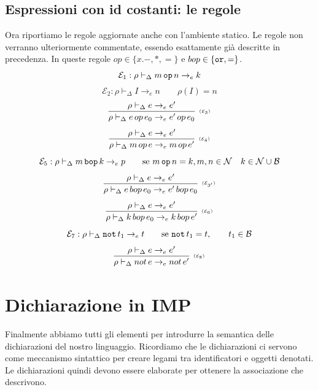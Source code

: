 \documentclass[oneside,a4paper,11pt]{book}
\theoremstyle{italicstyle}
\theoremstyle{normStyle}
\begin{document}
\subsection{Espressioni con id costanti: le regole}
Ora riportiamo le regole aggiornate anche con l'ambiente statico. Le regole 
non verranno ulteriormente commentate, essendo esattamente già descritte in precedenza.
In queste regole $op\in\{x.-,*,=\}$ e $bop\in\{\verb|or|, =\}$.
\[
  \mathcal{E}_1: \rho \vdash_\Delta m \, \verb|op|\,n \rightarrow_e k
\]
\[
  \mathcal{E}_2: \rho \vdash_\Delta I \rightarrow_e n \qquad \rho(I)=n
\]
\[
    \infer[\scriptscriptstyle (\mathcal{E}_3)]
    {
      \rho \vdash_\Delta e \, op \, e_0 \rightarrow_e e' \, op \, e_0
    }
    {
      \rho \vdash_\Delta e \rightarrow_e e'
    }
\]
\[
    \infer[\scriptscriptstyle (\mathcal{E}_4)]
    {
      \rho \vdash_\Delta  m \, op \, e \rightarrow_e m \, op \, e'
    }
    {
      \rho \vdash_\Delta  e \rightarrow_e e'
    }
\]
\[
  \mathcal{E}_5: \rho \vdash_\Delta m\,\verb|bop|\,k\rightarrow_e p \qquad \text{se }m\,\verb|op|\,n = k,m,n \in \mathcal{N}\quad k \in \mathcal{N}\cup\mathcal{B}
\]
\[
    \infer[\scriptscriptstyle (\mathcal{E}_{3'})]
    {
      \rho \vdash_\Delta e \, bop \, e_0 \rightarrow_e e' \, bop \, e_0
    }
    {
      \rho \vdash_\Delta e \rightarrow_e e'
    }
\]
\[
    \infer[\scriptscriptstyle (\mathcal{E}_{6})]
    {
      \rho \vdash_\Delta k \, bop \, e_0 \rightarrow_e k \, bop \, e'
    }
    {
      \rho \vdash_\Delta e \rightarrow_e e'
    }
\]
\[
  \mathcal{E}_7: \rho \vdash_\Delta \verb|not| \,t_1\rightarrow_e t \qquad \text{se }\verb|not|\,t_1 = t, \qquad t_1\in \mathcal{B}
\]
\[
    \infer[\scriptscriptstyle (\mathcal{E}_{8})]
    {
      \rho \vdash_\Delta not \, e \rightarrow_e not \, e'
    }
    {
      \rho \vdash_\Delta e \rightarrow_e e'
    }
\]
\section{Dichiarazione in IMP}
Finalmente abbiamo tutti gli elementi per introdurre la semantica delle dichiarazioni
del nostro linguaggio. Ricordiamo che le dichiarazioni ci servono come meccanismo
sintattico per creare legami tra identificatori e oggetti denotati. Le dichiarazioni
quindi devono essere elaborate per ottenere la associazione che descrivono.
\end{document}
